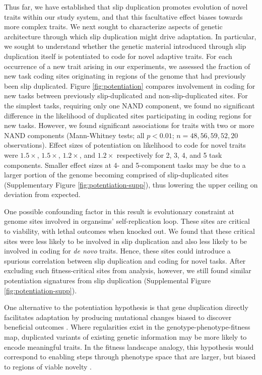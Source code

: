 Thus far, we have established that slip duplication promotes evolution of novel traits within our study system, and that this facultative effect biases towards more complex traits.
We next sought to characterize aspects of genetic architecture through which slip duplication might drive adaptation.
In particular, we sought to understand whether the genetic material introduced through slip duplication itself is potentiated to code for novel adaptive traits.
For each occurrence of a new trait arising in our experiments, we assessed the fraction of new task coding sites originating in regions of the genome that had previously been slip duplicated.
Figure \ref{fig:potentiation} compares involvement in coding for new tasks between previously slip-duplicated and non-slip-duplicated sites.
For the simplest tasks, requiring only one NAND component, we found no significant difference in the likelihood of duplicated sites participating in coding regions for new tasks.
However, we found significant associations for traits with two or more NAND components (Mann-Whitney tests; all $p < 0.01$; $n=48,56,59,52,20$ observations).
Effect sizes of potentiation on likelihood to code for novel traits were $1.5\times$, $1.5\times$, $1.2\times$, and $1.2\times$ respectively for 2, 3, 4, and 5 task components.
Smaller effect sizes at 4- and 5-component tasks may be due to a larger portion of the genome becoming comprised of slip-duplicated sites (Supplementary Figure \ref{fig:potentiation-supp}), thus lowering the upper ceiling on deviation from expected.

One possible confounding factor in this result is evolutionary constraint at genome sites involved in organsims' self-replication loop.
These sites are critical to viability, with lethal outcomes when knocked out.
We found that these critical sites were less likely to be involved in slip duplication and also less likely to be involved in coding for \textit{de novo} traits.
Hence, these sites could introduce a spurious correlation between slip duplication and coding for novel tasks.
After excluding such fitness-critical sites from analysis,
however, we still found similar potentiation signatures from slip duplication (Supplemental Figure \ref{fig:potentiation-supp}).

One alternative to the potentiation hypothesis is that gene duplication directly facilitates adaptation by producing mutational changes biased to discover beneficial outcomes \citep{kondrashov2012gene}.
Where regularities exist in the genotype-phenotype-fitness map, duplicated variants of existing genetic information may be more likely to encode meaningful traits.
In the fitness landscape analogy, this hypothesis would correspond to enabling steps through phenotype space that are larger, but biased to regions of viable novelty \citep{tarapore2015evolvability}.

